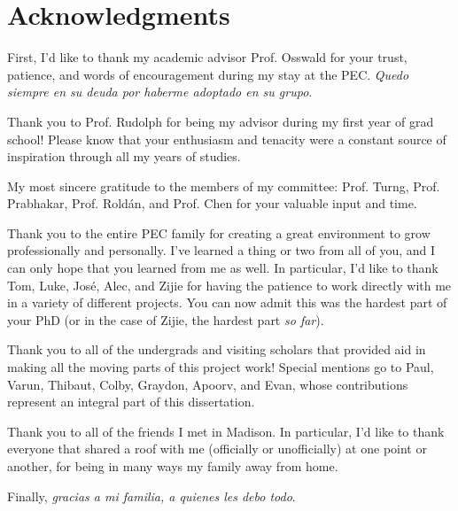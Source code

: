 \documentclass[main.tex]{subfiles}
\begin{document}
\chapter*{Acknowledgments}
{
\setlength{\parindent}{0cm}
\setlength{\parskip}{12pt}

First, I'd like to thank my academic advisor Prof. Osswald for your trust,  patience, and words of encouragement during my stay at the PEC. \emph{Quedo siempre en su deuda por haberme adoptado en su grupo}.

Thank you to Prof. Rudolph for being my advisor during my first year of grad school! Please know that your enthusiasm and tenacity were a constant source of inspiration through all my years of studies. 

My most sincere gratitude to the members of my committee: Prof. Turng, Prof. Prabhakar, Prof. Rold\'an, and Prof. Chen for your valuable input and time.

Thank you to the entire PEC family for creating a great environment to grow professionally and personally. I've learned a thing or two from all of you, and I can only hope that you learned from me as well. In particular, I'd like to thank Tom, Luke, Jos\'e, Alec, and Zijie for having the patience to work directly with me in a variety of different projects. You can now admit this was the hardest part of your PhD (or in the case of Zijie, the hardest part \emph{so far}).

Thank you to all of the undergrads and visiting scholars that provided aid in making all the moving parts of this project work! Special mentions go to Paul, Varun, Thibaut, Colby, Graydon, Apoorv, and Evan, whose contributions represent an integral part of this dissertation.

Thank you to all of the friends I met in Madison. In particular, I'd like to thank everyone that shared a roof with me (officially or unofficially) at one point or another, for being in many ways my family away from home. 

Finally, \emph{gracias a mi familia, a quienes les debo todo}. 

}
\end{document}
